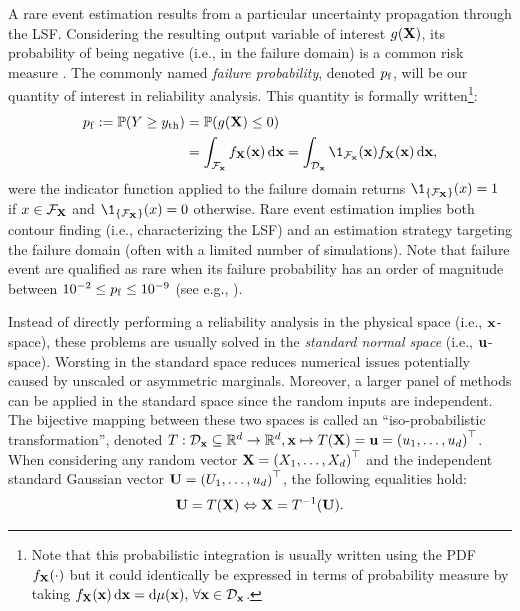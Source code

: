 A rare event estimation results from a particular uncertainty propagation through the LSF. 
Considering the resulting output variable of interest $g({\bf X})$, its probability of being negative (i.e., in the failure domain) is a common risk measure .
The commonly named \textit{failure probability}, denoted $p_\mathrm{f}$, will be our quantity of interest in reliability analysis.
This quantity is formally written\footnote{Note that this probabilistic integration is usually written using the PDF $f_{\bf X}(\cdot)$ 
but it could identically be expressed in terms of probability measure by taking $f_{\bf X}({\bf x}) \, \mathrm{d}{\bf x} = \mathrm{d} \mu({\bf x}), \, \forall {\bf x} \in \mathcal{D}_{\bf x}$.}: 
\begin{equation}
    \begin{split}
        \pf := \P(Y \geq \yth) &= \P(g(\bX) \leq 0)\\
        &= \int_{\iF_\bx} f_\bX(\bx) \, \dd\bx
        = \int_{\iD_\bx} \1_{\iF_\bx}(\bx) f_\bX(\bx) \, \dd\bx,
    \end{split}
\end{equation}
were the indicator function applied to the failure domain returns $\1_{\left\{\iF_{\bX}\right\}}(x) = 1$ if $x \in \mathcal{F}_{{\bf X}}$ and $\1_{\left\{\iF_{\bX}\right\}}(x) = 0$ otherwise.
Rare event estimation implies both contour finding (i.e., characterizing the LSF) and an estimation strategy targeting the failure domain (often with a limited number of simulations).
Note that failure event are qualified as rare when its failure probability has an order of magnitude between $10^{-2} \leq p_\mathrm{f} \leq 10^{-9}$ (see e.g., \citet{lemaire_2013}).

Instead of directly performing a reliability analysis in the physical space (i.e., ${\bf x}$-space), these problems are usually solved in the \emph{standard normal space} (i.e., ${\bf u}$-space).
Worsting in the standard space reduces numerical issues potentially caused by unscaled or asymmetric marginals. 
Moreover, a larger panel of methods can be applied in the standard space since the random inputs are independent.   
The bijective mapping between these two spaces is called an ``iso-probabilistic transformation'', 
denoted $T: \mathcal{D}_{{\bf x}} \subseteq \mathbb{R}^d \rightarrow \mathbb{R}^d, {\bf x} \mapsto T({\bf X}) = {\bf u} = \left(u_1, \dots, u_d\right)^\top$. 
When considering any random vector ${\bf X} = \left(X_1, \dots, X_d\right)^\top$ and the independent standard Gaussian vector ${\bf U} = \left(U_1, \dots, u_d\right)^\top$, the following equalities hold:
\begin{equation}
    {\bf U} = T({\bf X}) \Leftrightarrow {\bf X} = T^{-1}({\bf U}).
\end{equation} 

